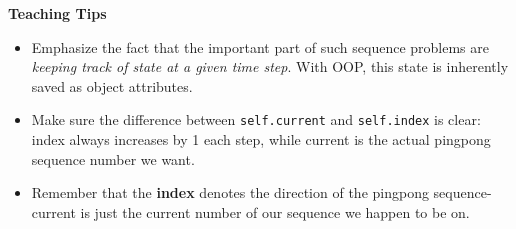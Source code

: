 \begin{blocksection}
\begin{guide}
\textbf{Teaching Tips}
  \begin{itemize}
    \item Emphasize the fact that the important part of such sequence problems are \textit{keeping track of state at a given time step}. With OOP, this state is inherently saved as object attributes. 
    \item Make sure the difference between \verb|self.current| and \verb|self.index| is clear: index always increases by 1 each step, while current is the actual pingpong sequence number we want. 
    \item Remember that the \textbf{index} denotes the direction of the pingpong sequence- current is just the current number of our sequence we happen to be on. 
  \end{itemize}
\end{guide}
\end{blocksection}


